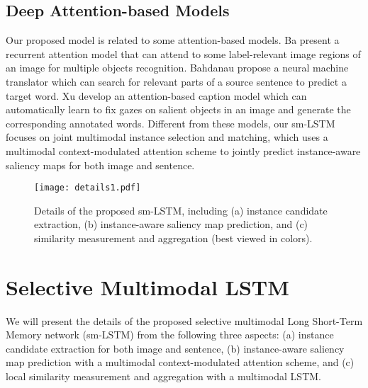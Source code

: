 \documentclass[10pt,twocolumn,letterpaper]{article}
\begin{document}
\subsection{Deep Attention-based Models}

Our proposed model is related to some attention-based models.
Ba \etal \cite{ba2014multiple} present a recurrent attention model
that can attend to some label-relevant image regions of an image for multiple objects recognition.
Bahdanau \etal \cite{bahdanau2014neural} propose a neural machine translator which
can search for relevant parts of a source sentence to predict a target word.
Xu \etal \cite{xu2015show} develop an attention-based caption model
which can automatically learn to fix gazes on salient objects in an image
and generate the corresponding annotated words.
Different from these models, our sm-LSTM focuses on
joint multimodal instance selection and matching,
which uses a multimodal context-modulated attention scheme
to jointly predict instance-aware saliency maps for both image and sentence.













\begin{figure*}[t]
\begin{center}
\texttt{[image: details1.pdf]}
\end{center}
\caption{Details of the proposed sm-LSTM, including (a) instance candidate extraction, (b) instance-aware saliency map prediction,
and (c) similarity measurement and aggregation (best viewed in colors).}
\label{fig:details}
\end{figure*}


\section{Selective Multimodal LSTM}
We will present the details of the proposed selective multimodal Long Short-Term Memory network (sm-LSTM)
from the following three aspects: (a) instance candidate extraction for both image and sentence,
(b) instance-aware saliency map prediction with a multimodal context-modulated attention scheme,
and (c) local similarity measurement and aggregation with a multimodal LSTM.
\end{document}
